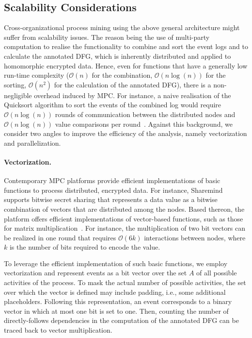 \subsection{Scalability Considerations}
\label{sec:div_and_conq}

Cross-organizational process mining using the above general architecture might 
suffer from scalability issues. The reason being the use of multi-party 
computation to realise the functionality to combine and sort the event logs and 
to calculate the annotated DFG, which is inherently distributed and applied to 
homomorphic encrypted data. Hence, even 
for functions that have a generally low run-time complexity ($\mathcal{O}(n)$ 
for the combination, $\mathcal{O}(n\log(n))$ for the sorting, 
$\mathcal{O}(n^2)$ for 
the calculation of the annotated DFG), there is a non-negligible overhead 
induced by MPC. For instance, a naive realisation of the Quicksort algorithm to 
sort the events of the combined log would require $\mathcal{O}(n\log(n))$ 
rounds of communication between the distributed nodes and 
$\mathcal{O}(n\log(n))$ value comparisons per round~\cite{Hamada12}. Against 
this background, we consider two angles to improve the efficiency of 
the analysis, namely vectorization and parallelization. 

\paragraph{Vectorization.} Contemporary MPC platforms provide efficient 
implementations of basic functions to process distributed, encrypted data. 
For instance, Sharemind supports bitwise secret sharing that represents a data 
value as a bitwise combination of vectors that are distributed among the nodes. 
Based thereon, the platform offers efficient implementations of vector-based 
functions, such as those for matrix 
multiplication~\cite{kerik2016optimizing,laud2017privacy}. For instance, the 
multiplication of two bit vectors can be realized in one round that requires 
$\mathcal{O}(6k)$ interactions between nodes, where $k$ is the number of bits 
required to encode the value. 

To leverage the efficient implementation of such basic functions, we employ 
vectorization and represent events as a bit vector over the set $A$ of all 
possible activities of the process. To mask the actual number of possible 
activities, the set over which the vector is defined may include padding, i.e., 
some additional placeholders. Following this representation, an event 
corresponds to a binary vector in which at most one bit is set to one. Then, 
counting the number of directly-follows dependencies in the computation of the 
annotated DFG can be traced back to vector multiplication. 


